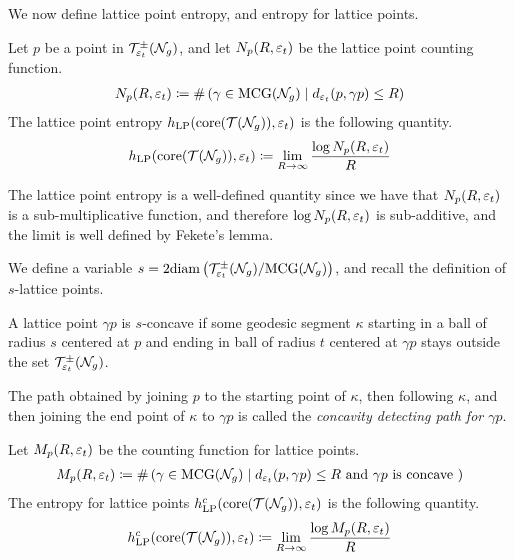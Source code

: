 We now define lattice point entropy, and entropy for \concave lattice points.
\begin{definition}
  Let $p$ be a point in $\mathcal{T}_{\varepsilon_t}^{\pm}(\mathcal{N}_g)$, and let $N_p(R, \varepsilon_t)$ be the lattice point counting function.
  \begin{align*}
    N_p(R, \varepsilon_t) \coloneqq \#\left( \gamma \in \mathrm{MCG}(\mathcal{N}_g) \mid d_{\varepsilon_t}(p, \gamma p) \leq R \right)
  \end{align*}
  The lattice point entropy $h_{\mathrm{LP}}(\mathrm{core}(\mathcal{T}(\mathcal{N}_g)), \varepsilon_t)$ is the following quantity.
  \begin{align*}
    h_{\mathrm{LP}}(\mathrm{core}(\mathcal{T}(\mathcal{N}_g)), \varepsilon_t) \coloneqq \lim_{R \to \infty} \frac{\log N_p(R, \varepsilon_t)}{R}
  \end{align*}
\end{definition}

\begin{remark}
  The lattice point entropy is a well-defined quantity since we have that $N_p(R, \varepsilon_t)$ is a sub-multiplicative function, and therefore $\log N_p(R, \varepsilon_t)$ is sub-additive, and the limit is well defined by Fekete's lemma.
\end{remark}

 We define a variable $s = 2 \mathrm{diam} \left( \mathcal{T}_{\varepsilon_t}^{\pm}(\mathcal{N}_g)/\mathrm{MCG}(\mathcal{N}_g) \right)$, and recall the definition of $s$-\concave lattice points.
\begin{definition}
 A lattice point $\gamma p$ is $s$-concave if some geodesic segment $\kappa$ starting in a ball of radius $s$ centered at $p$ and ending in ball of radius $t$ centered at $\gamma p$ stays outside the set $\mathcal{T}_{\varepsilon_t}^{\pm}(\mathcal{N}_g)$.

  The path obtained by joining $p$ to the starting point of $\kappa$, then following $\kappa$, and then joining the end point of $\kappa$ to $\gamma p$ is called the \emph{concavity detecting path for $\gamma p$}.
\end{definition}

\begin{definition}
  Let $M_p(R, \varepsilon_t)$ be the counting function for \concave lattice points.
  \begin{align*}
    M_p(R, \varepsilon_t) \coloneqq \#\left( \gamma \in \mathrm{MCG}(\mathcal{N}_g) \mid \text{$d_{\varepsilon_t}(p, \gamma p) \leq R$ and $\gamma p$ is concave }  \right)
  \end{align*}
  The entropy for \concave lattice points $h_{\mathrm{LP}}^c(\mathrm{core}(\mathcal{T}(\mathcal{N}_g)), \varepsilon_t)$ is the following quantity.
  \begin{align*}
    h_{\mathrm{LP}}^c(\mathrm{core}(\mathcal{T}(\mathcal{N}_g)), \varepsilon_t) \coloneqq \lim_{R \to \infty} \frac{\log M_p(R, \varepsilon_t)}{R}
  \end{align*}
\end{definition}

